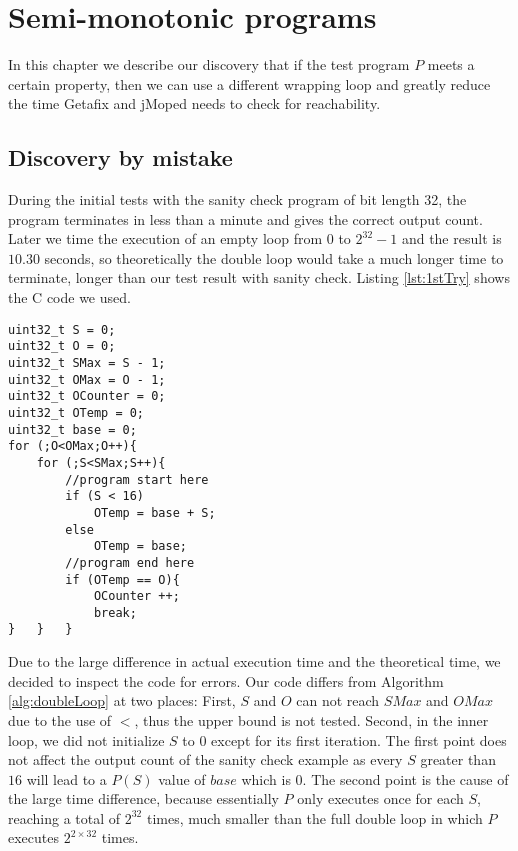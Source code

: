 \chapter{Semi-monotonic programs}
	\label{CH_03}

In this chapter we describe our discovery that if the test program $P$ meets a certain property, then we can use a different wrapping loop and greatly reduce the time Getafix and jMoped needs to check for reachability.

\section{Discovery by mistake}
During the initial tests with the sanity check program of bit length 32, the program terminates in less than a minute and gives the correct output count. Later we time the execution of an empty loop from $0$ to $2^{32} - 1$ and the result is $10.30$ seconds, so theoretically the double loop would take a much longer time to terminate, longer than our test result with sanity check.  Listing \ref{lst:1stTry} shows the C code we used.

\lstset{language=C}  
\begin{lstlisting}[float, caption={Initial implementation of the double loop with sanity check in C.},label=lst:1stTry]
uint32_t S = 0;
uint32_t O = 0;
uint32_t SMax = S - 1;
uint32_t OMax = O - 1;
uint32_t OCounter = 0;
uint32_t OTemp = 0;
uint32_t base = 0;
for (;O<OMax;O++){
	for (;S<SMax;S++){
		//program start here
		if (S < 16)
			OTemp = base + S;
		else
			OTemp = base;
		//program end here
		if (OTemp == O){
			OCounter ++;
			break;
}	}	}
\end{lstlisting}

Due to the large difference in actual execution time and the theoretical time, we decided to inspect the code for errors. Our code differs from Algorithm \ref{alg:doubleLoop} at two places: First, $S$ and $O$ can not reach $SMax$ and $OMax$ due to the use of $<$, thus the upper bound is not tested. Second, in the inner loop, we did not initialize $S$ to $0$ except for its first iteration. The first point does not affect the output count of the sanity check example as every $S$ greater than $16$ will lead to a $P(S)$ value of $base$ which is $0$. The second point is the cause of the large time difference, because essentially $P$ only executes once for each $S$, reaching a total of $2^{32}$ times, much smaller than the full double loop in which $P$ executes $2^{2 \times 32}$ times.

